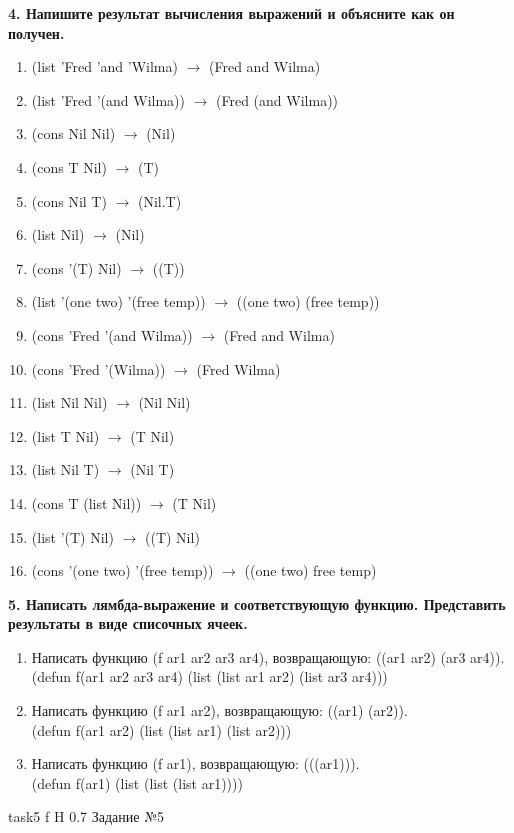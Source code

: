 \textbf{4. Напишите результат вычисления выражений и объясните как он получен.}

\begin{enumerate}
	\item (list 'Fred 'and 'Wilma) $\rightarrow$ (Fred and Wilma)
	\item (list 'Fred '(and Wilma)) $\rightarrow$ (Fred (and Wilma))
	\item (cons Nil Nil) $\rightarrow$ (Nil)
	\item (cons T Nil) $\rightarrow$ (T)
	\item (cons Nil T) $\rightarrow$ (Nil.T)
	\item (list Nil) $\rightarrow$ (Nil)
	\item (cons '(T) Nil) $\rightarrow$ ((T))
	\item (list '(one two) '(free temp)) $\rightarrow$ ((one two) (free temp))
	\item (cons 'Fred '(and Wilma)) $\rightarrow$ (Fred and Wilma)
	\item (cons 'Fred '(Wilma)) $\rightarrow$ (Fred Wilma)
	\item (list Nil Nil) $\rightarrow$ (Nil Nil)
	\item (list T Nil) $\rightarrow$ (T Nil)
	\item (list Nil T) $\rightarrow$ (Nil T)
	\item (cons T (list Nil)) $\rightarrow$ (T Nil)
	\item (list '(T) Nil) $\rightarrow$ ((T) Nil)
	\item (cons '(one two) '(free temp)) $\rightarrow$ ((one two) free temp)
\end{enumerate}

\textbf{5. Написать лямбда-выражение и соответствующую функцию. Представить результаты в виде списочных ячеек.}

\begin{enumerate}
	\item Написать функцию (f ar1 ar2 ar3 ar4), возвращающую: ((ar1 ar2) (ar3 ar4)).\\
	(defun f(ar1 ar2 ar3 ar4) (list (list ar1 ar2) (list ar3 ar4)))
	
	\item Написать функцию (f ar1 ar2), возвращающую: ((ar1) (ar2)).\\
	(defun f(ar1 ar2) (list (list ar1) (list ar2)))
	
	\item Написать функцию (f ar1), возвращающую: (((ar1))).\\
	(defun f(ar1) (list (list (list ar1))))
\end{enumerate}

{task5} %
{f} %
{H} %
{0.7\textwidth} %
{Задание №5} %